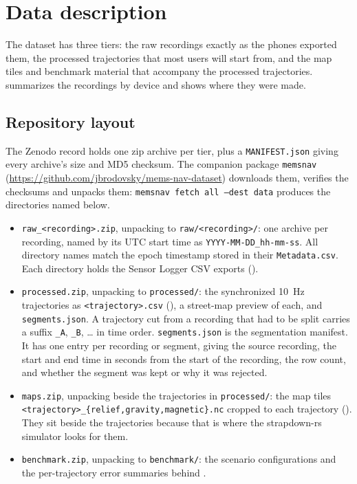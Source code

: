 \section{Data description}
\label{sec:description}

The dataset has three tiers: the raw recordings exactly as the phones exported them, the processed trajectories that most users will start from, and the map tiles and benchmark material that accompany the processed trajectories.  summarizes the recordings by device and  shows where they were made.

\subsection{Repository layout}
\label{sec:layout}

The Zenodo record  holds one zip archive per tier, plus a \texttt{MANIFEST.json} giving every archive's size and MD5 checksum. The companion package \texttt{memsnav} (\url{https://github.com/jbrodovsky/mems-nav-dataset}) downloads them, verifies the checksums and unpacks them: \texttt{memsnav fetch all --dest data} produces the directories named below.

\begin{itemize}
\item \texttt{raw\_<recording>.zip}, unpacking to \texttt{raw/<recording>/}: one archive per recording, named by its UTC start time as \texttt{YYYY-MM-DD\_hh-mm-ss}. All \numUtcNamed{} directory names match the epoch timestamp stored in their \texttt{Metadata.csv}. Each directory holds the Sensor Logger CSV exports ().
\item \texttt{processed.zip}, unpacking to \texttt{processed/}: the \numTrajectories{} synchronized 10~Hz trajectories as \texttt{<trajectory>.csv} (), a street-map preview of each, and \texttt{segments.json}. A trajectory cut from a recording that had to be split carries a suffix \texttt{\_A}, \texttt{\_B}, \ldots{} in time order. \texttt{segments.json} is the segmentation manifest. It has one entry per recording or segment, giving the source recording, the start and end time in seconds from the start of the recording, the row count, and whether the segment was kept or why it was rejected.
\item \texttt{maps.zip}, unpacking beside the trajectories in \texttt{processed/}: the map tiles \texttt{<trajectory>\_\{relief,gravity,magnetic\}.nc} cropped to each trajectory (). They sit beside the trajectories because that is where the strapdown-rs simulator looks for them.
\item \texttt{benchmark.zip}, unpacking to \texttt{benchmark/}: the scenario configurations and the per-trajectory error summaries behind .
\end{itemize}

